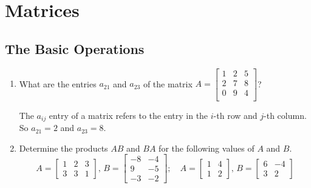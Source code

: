 \section{Matrices}

\subsection{The Basic Operations}

\begin{enumerate}[label=1.\arabic*]
    \item What are the entries $a_{21}$ and $a_{23}$ of the matrix $A = \begin{bmatrix}
        1 & 2 & 5 \\
        2 & 7 & 8 \\
        0 & 9 & 4 \\
    \end{bmatrix}$?

    \begin{mysolution}
        The $a_{ij}$ entry of a matrix refers to the entry in the $i$-th row and $j$-th column. So $a_{21} = 2$ and $a_{23} = 8$.
    \end{mysolution}

    \item Determine the products $AB$ and $BA$ for the following values of $A$ and $B$.
    \[
        A = \begin{bmatrix}
            1 & 2 & 3 \\
            3 & 3 & 1
        \end{bmatrix},\,
        B = \begin{bmatrix}
            -8 & -4 \\
            9 & -5 \\
            -3 & -2
        \end{bmatrix}; \quad
        A = \begin{bmatrix}
            1 & 4 \\
            1 & 2
        \end{bmatrix},\,
        B = \begin{bmatrix}
            6 & -4 \\
            3 & 2
        \end{bmatrix}
    \]


\end{enumerate}

